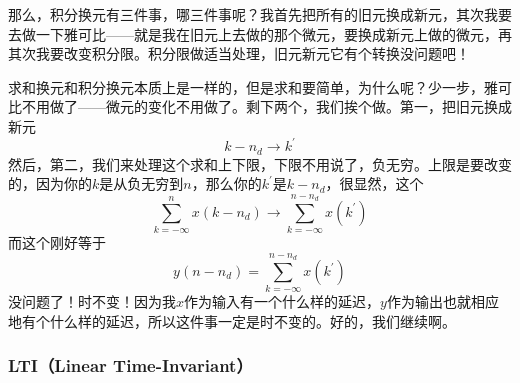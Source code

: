 \documentclass[a4paper,12pt]{article}
\begin{document}
那么，积分换元有三件事，哪三件事呢？我首先把所有的旧元换成新元，其次我要去做一下雅可比——就是我在旧元上去做的那个微元，要换成新元上做的微元，再其次我要改变积分限。积分限做适当处理，旧元新元它有个转换没问题吧！

求和换元和积分换元本质上是一样的，但是求和要简单，为什么呢？少一步，雅可比不用做了——微元的变化不用做了。剩下两个，我们挨个做。第一，把旧元换成新元
\begin{equation}
   k-n_d \longrightarrow k^{' }
\end{equation}
然后，第二，我们来处理这个求和上下限，下限不用说了，负无穷。上限是要改变的，因为你的$k$是从负无穷到$n$，那么你的$k^{' }$是$k-n_d$，很显然，这个
\begin{equation}
  \sum_{k=-\infty}^{n}x(k-n_d)\longrightarrow\sum_{k=-\infty}^{n-n_d}x(k^{' })
\end{equation}
而这个刚好等于
\begin{equation}
   y(n-n_d)=\sum_{k=-\infty}^{n-n_d}x(k^{' })
\end{equation}
没问题了！时不变！因为我$x$作为输入有一个什么样的延迟，$y$作为输出也就相应地有个什么样的延迟，所以这件事一定是时不变的。好的，我们继续啊。

\subsubsection{LTI（Linear Time-Invariant）}\quad
\end{document}

